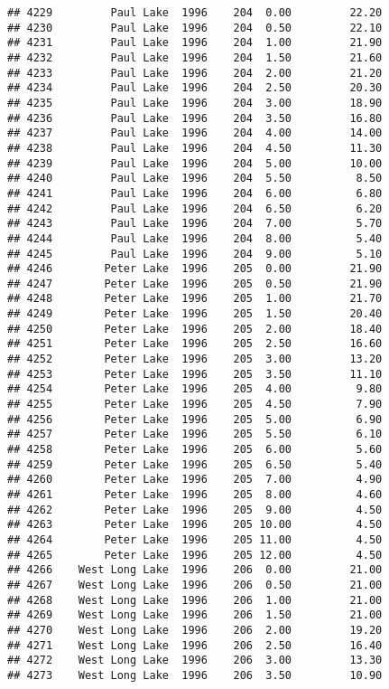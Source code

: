 \documentclass[
]{article}
\begin{document}
\begin{verbatim}
## 4229         Paul Lake  1996    204  0.00         22.20
## 4230         Paul Lake  1996    204  0.50         22.10
## 4231         Paul Lake  1996    204  1.00         21.90
## 4232         Paul Lake  1996    204  1.50         21.60
## 4233         Paul Lake  1996    204  2.00         21.20
## 4234         Paul Lake  1996    204  2.50         20.30
## 4235         Paul Lake  1996    204  3.00         18.90
## 4236         Paul Lake  1996    204  3.50         16.80
## 4237         Paul Lake  1996    204  4.00         14.00
## 4238         Paul Lake  1996    204  4.50         11.30
## 4239         Paul Lake  1996    204  5.00         10.00
## 4240         Paul Lake  1996    204  5.50          8.50
## 4241         Paul Lake  1996    204  6.00          6.80
## 4242         Paul Lake  1996    204  6.50          6.20
## 4243         Paul Lake  1996    204  7.00          5.70
## 4244         Paul Lake  1996    204  8.00          5.40
## 4245         Paul Lake  1996    204  9.00          5.10
## 4246        Peter Lake  1996    205  0.00         21.90
## 4247        Peter Lake  1996    205  0.50         21.90
## 4248        Peter Lake  1996    205  1.00         21.70
## 4249        Peter Lake  1996    205  1.50         20.40
## 4250        Peter Lake  1996    205  2.00         18.40
## 4251        Peter Lake  1996    205  2.50         16.60
## 4252        Peter Lake  1996    205  3.00         13.20
## 4253        Peter Lake  1996    205  3.50         11.10
## 4254        Peter Lake  1996    205  4.00          9.80
## 4255        Peter Lake  1996    205  4.50          7.90
## 4256        Peter Lake  1996    205  5.00          6.90
## 4257        Peter Lake  1996    205  5.50          6.10
## 4258        Peter Lake  1996    205  6.00          5.60
## 4259        Peter Lake  1996    205  6.50          5.40
## 4260        Peter Lake  1996    205  7.00          4.90
## 4261        Peter Lake  1996    205  8.00          4.60
## 4262        Peter Lake  1996    205  9.00          4.50
## 4263        Peter Lake  1996    205 10.00          4.50
## 4264        Peter Lake  1996    205 11.00          4.50
## 4265        Peter Lake  1996    205 12.00          4.50
## 4266    West Long Lake  1996    206  0.00         21.00
## 4267    West Long Lake  1996    206  0.50         21.00
## 4268    West Long Lake  1996    206  1.00         21.00
## 4269    West Long Lake  1996    206  1.50         21.00
## 4270    West Long Lake  1996    206  2.00         19.20
## 4271    West Long Lake  1996    206  2.50         16.40
## 4272    West Long Lake  1996    206  3.00         13.30
## 4273    West Long Lake  1996    206  3.50         10.90

\end{verbatim}
\end{document}
